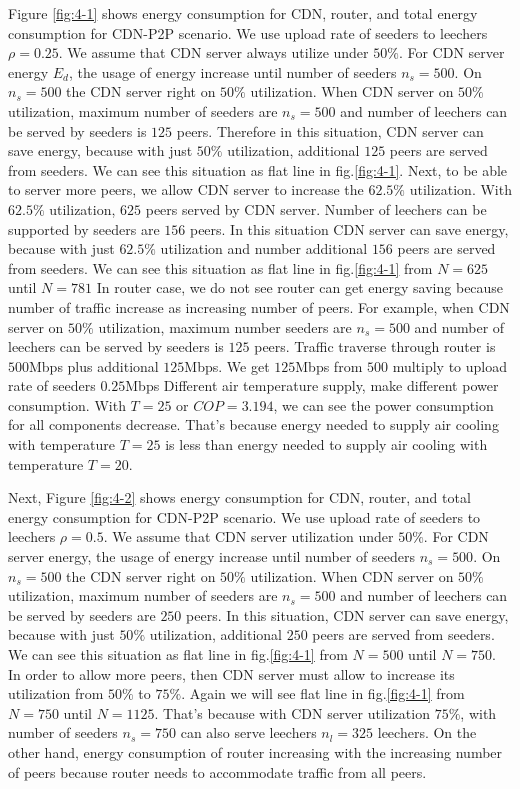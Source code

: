 \documentclass[JIP]{ipsj}
\begin{document}
Figure \ref{fig:4-1} shows energy consumption for CDN, router, and total energy consumption for CDN-P2P scenario.
We use upload rate of seeders to leechers $\rho=0.25$.
We assume that CDN server always utilize under $50\%$.
For CDN server energy $E_d$, the usage of energy increase until number of seeders $n_s=500$.
On $n_s=500$ the CDN server right on $50\%$ utilization.
When CDN server on $50\%$ utilization, maximum number of seeders are $n_s=500$ and number of leechers can be served by seeders is $125$ peers.  
Therefore in this situation, CDN server can save energy, because with just $50\%$ utilization, additional $125$ peers are served from seeders.  
We can see this situation as flat line in fig.\ref{fig:4-1}.
Next, to be able to server more peers, we allow CDN server to increase the $62.5\%$ utilization.
With $62.5\%$ utilization, $625$ peers served by CDN server. 
Number of leechers can be supported by seeders are $156$ peers.
In this situation CDN server can save energy, because with just $62.5\%$ utilization and number additional $156$ peers are served from seeders.  
We can see this situation as flat line in fig.\ref{fig:4-1} from $N=625$ until $N=781$
In router case, we do not see router can get energy saving because number of traffic increase as increasing number of peers. 
For example, when CDN server on $50\%$ utilization, maximum number seeders are $n_s=500$ and number of leechers can be served by seeders is $125$ peers.
Traffic traverse through router is $500$Mbps plus additional $125$Mbps. 
We get $125$Mbps from $500$ multiply to upload rate of seeders $0.25$Mbps
Different air temperature supply, make different power consumption.  
With $T=25$ or $COP=3.194$, we can see the power consumption for all components decrease.
That's because energy needed to supply air cooling with temperature $T=25$ is less than  energy needed to supply air cooling with temperature $T=20$.

Next, Figure \ref{fig:4-2} shows energy consumption for CDN, router, and total energy consumption for CDN-P2P scenario.
We use upload rate of seeders to leechers $\rho=0.5$.
We assume that CDN server utilization under $50\%$.
For CDN server energy, the usage of energy increase until number of seeders $n_s=500$.
On $n_s=500$ the CDN server right on $50\%$ utilization.
When CDN server on $50\%$ utilization, maximum number of seeders are $n_s=500$ and number of leechers can be served by seeders are $250$ peers.
In this situation, CDN server can save energy, because with just $50\%$ utilization, additional $250$ peers are served from seeders. 
We can see this situation as flat line in fig.\ref{fig:4-1} from $N=500$ until $N=750$.
In order to allow more peers, then CDN server must allow to increase its utilization from $50\%$ to $75\%$.
Again we will see flat line in fig.\ref{fig:4-1} from $N=750$ until $N=1125$. 
That's because with CDN server utilization $75\%$, with number of seeders $n_s=750$ can also serve leechers $n_l=325$ leechers.
On the other hand, energy consumption of router increasing with the increasing number of peers because router needs to accommodate traffic from all peers. 
\end{document}
